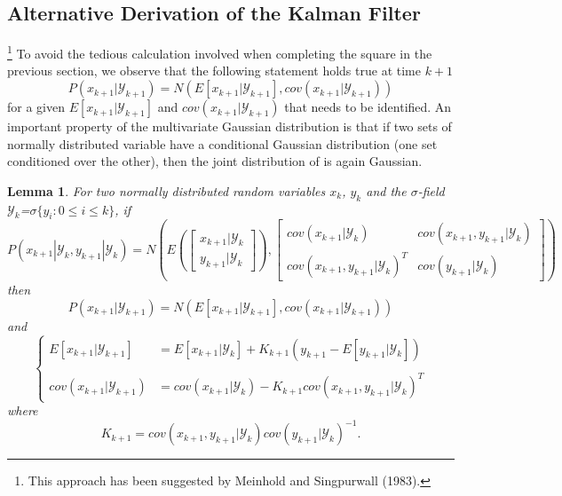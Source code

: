 \documentclass{article}
\newtheorem{lem}[thm]{Lemma}
\theoremstyle{definition}
\theoremstyle{remark}
\newcommand{\filtrationObs}[1]{\ensuremath{\mathscr{Y}_{#1}}}
\begin{document}
\subsection{Alternative Derivation of the Kalman Filter}\label{proof:kal2}
\footnote{This approach has been suggested by Meinhold and Singpurwall (1983).}
To avoid the tedious calculation involved when completing the square in the previous section, we observe that the following statement holds true at time $k+1$
\begin{equation*}
P(x_{k+1}|\filtrationObs{k+1})=N\left( E[x_{k+1}|\filtrationObs{k+1}], cov(x_{k+1}|\filtrationObs{k+1}) \right)
\end{equation*}
for a given $E[x_{k+1}|\filtrationObs{k+1}]$ and $cov(x_{k+1}|\filtrationObs{k+1})$ that needs to be identified. An important property of the multivariate Gaussian distribution is that if two sets of normally distributed variable have a conditional Gaussian distribution (one set conditioned over the other), then the joint distribution of is again Gaussian. 
\begin{lem}\label{lem:kal2}
For two normally distributed random variables $x_k$, $y_k$ and the $\sigma$-field \filtrationObs{k}=$\sigma\{ y_i: 0 \leq i \leq k\}$,
if
$$P(x_{k+1}|\filtrationObs{k},y_{k+1}|\filtrationObs{k})=N\left(
E\left( \begin{bmatrix} x_{k+1}|\filtrationObs{k}\\ y_{k+1}|\filtrationObs{k} \end{bmatrix} \right)
, \begin{bmatrix}
cov(x_{k+1}|\filtrationObs{k}) & cov(x_{k+1}, y_{k+1}|\filtrationObs{k})\\ 
cov(x_{k+1}, y_{k+1}|\filtrationObs{k})^T & cov(y_{k+1}|\filtrationObs{k})
\end{bmatrix}\right)$$
then 
$$P(x_{k+1}|\filtrationObs{k+1})
=N\left( E[x_{k+1}|\filtrationObs{k+1}], cov(x_{k+1}|\filtrationObs{k+1}) \right)$$
and 
\begin{equation*}
\left\{ 
\begin{array}{rl}
E[x_{k+1}|\filtrationObs{k+1}]&=E[x_{k+1}|\filtrationObs{k}]+K_{k+1}(y_{k+1}-E[y_{k+1}|\filtrationObs{k}])\\
\\
cov(x_{k+1}|\filtrationObs{k+1})&=cov(x_{k+1}|\filtrationObs{k})-K_{k+1}cov(x_{k+1}, y_{k+1}|\filtrationObs{k})^T
\end{array} \right.
\end{equation*}
where
$$K_{k+1}=cov(x_{k+1}, y_{k+1}|\filtrationObs{k})cov(y_{k+1}|\filtrationObs{k})^{-1}.$$
\end{lem}
\end{document}
